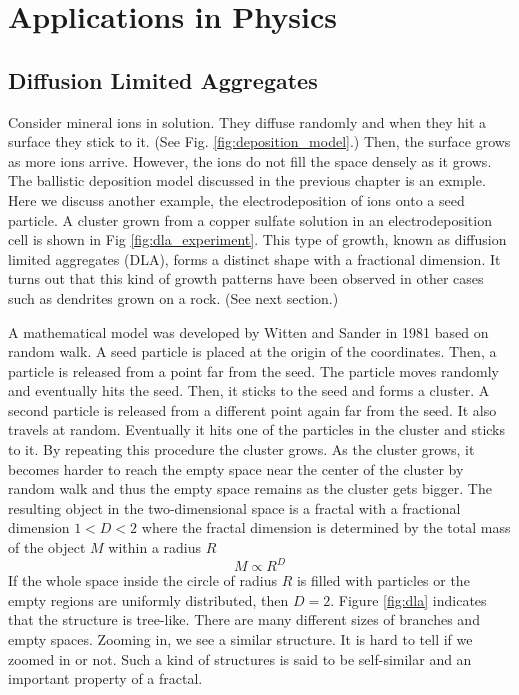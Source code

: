 \noindent
\section{Applications in Physics}

\subsection{Diffusion Limited Aggregates}


Consider mineral ions in solution.  They diffuse randomly and when they hit a surface they stick to it. (See Fig. \ref{fig:deposition_model}.)  Then, the surface grows as more ions arrive.  However, the ions do not fill the space densely as it grows. The ballistic deposition model discussed in the previous chapter is an exmple. Here we discuss another example, the electrodeposition of ions onto a seed particle.  A cluster grown from a copper sulfate solution in an electrodeposition cell is shown in Fig \ref{fig:dla_experiment}.  This type of growth, known as diffusion limited aggregates (DLA), forms a distinct shape with a fractional dimension.\cite{dla}  It turns out that this kind of growth patterns have been observed in other cases such as dendrites grown on a rock. (See next section.)

A mathematical model was developed by Witten and Sander in 1981\cite{dla_theory} based on random walk.  A seed particle is placed at the origin of the coordinates.  Then, a particle is released from a point far from the seed. The particle moves randomly and eventually hits the seed.  Then, it sticks to the seed and forms a cluster.  A second particle is released from a different point again far from the seed. It also travels at random.  Eventually it hits one of the particles in the cluster and sticks to it.  By repeating this procedure the cluster grows.  As the cluster grows, it becomes harder to reach the empty space near the center of the cluster by random walk and thus the empty space remains as the cluster gets bigger. The resulting object in the two-dimensional space is a fractal with a fractional dimension $1<D<2$ where the fractal dimension is determined by the total mass of the object $M$ within a radius $R$ 
\begin{equation}\label{eq:dla-fractal-dimension}
M \propto R^D
\end{equation}
If the whole space inside the circle of radius $R$ is filled with particles or the empty regions are uniformly distributed, then $D=2$.  Figure \ref{fig:dla} indicates that the structure is tree-like. There are many different sizes of branches and empty spaces.  Zooming in, we see a similar structure. It is hard to tell if we zoomed in or not.  Such a kind of structures is said to be self-similar and an important property of a fractal. 

